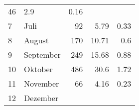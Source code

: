 \begin{longtable}{lXrrr}
       \num{46} &
       \num[round-mode=places,round-precision=2]{2.9} &
         \num[round-mode=places,round-precision=2]{0.16} \\

     7 &
     \multicolumn{1}{X}{ Juli   } &


       \num{92} &
       \num[round-mode=places,round-precision=2]{5.79} &
         \num[round-mode=places,round-precision=2]{0.33} \\

     8 &
     \multicolumn{1}{X}{ August   } &


       \num{170} &
       \num[round-mode=places,round-precision=2]{10.71} &
         \num[round-mode=places,round-precision=2]{0.6} \\

     9 &
     \multicolumn{1}{X}{ September   } &


       \num{249} &
       \num[round-mode=places,round-precision=2]{15.68} &
         \num[round-mode=places,round-precision=2]{0.88} \\

     10 &
     \multicolumn{1}{X}{ Oktober   } &


       \num{486} &
       \num[round-mode=places,round-precision=2]{30.6} &
         \num[round-mode=places,round-precision=2]{1.72} \\

     11 &
     \multicolumn{1}{X}{ November   } &


       \num{66} &
       \num[round-mode=places,round-precision=2]{4.16} &
         \num[round-mode=places,round-precision=2]{0.23} \\

     12 &
     \multicolumn{1}{X}{ Dezember   } &



\end{longtable}
